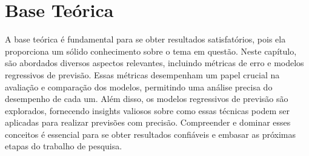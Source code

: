 \section{Base Te\'orica}\label{sec:base}

A base teórica é fundamental para se obter resultados satisfatórios, pois ela proporciona um sólido conhecimento sobre o tema em questão. Neste capítulo, são abordados diversos aspectos relevantes, incluindo métricas de erro e modelos regressivos de previsão. Essas métricas desempenham um papel crucial na avaliação e comparação dos modelos, permitindo uma análise precisa do desempenho de cada um. Além disso, os modelos regressivos de previsão são explorados, fornecendo insights valiosos sobre como essas técnicas podem ser aplicadas para realizar previsões com precisão. Compreender e dominar esses conceitos é essencial para se obter resultados confiáveis e embasar as próximas etapas do trabalho de pesquisa.











